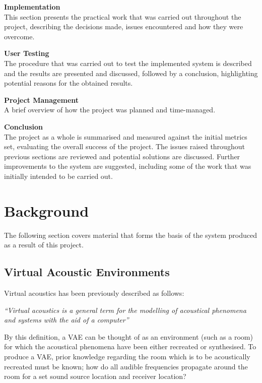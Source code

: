 \documentclass[../../main.tex]{subfiles}
\begin{document}
	\textbf{Implementation}\\
		This section presents the practical work that was carried out throughout the project, describing the decisions made, issues encountered and how they were overcome.

	\textbf{User Testing}\\	
		The procedure that was carried out to test the implemented system is described and the results are presented and discussed, followed by a conclusion, highlighting potential reasons for the obtained results.

	\textbf{Project Management}\\
		A brief overview of how the project was planned and time-managed.

	\textbf{Conclusion}\\
		The project as a whole is summarised and measured against the initial metrics set, evaluating the overall success of the project. The issues raised throughout previous sections are reviewed and potential solutions are discussed. Further improvements to the system are suggested, including some of the work that was initially intended to be carried out.

\pagebreak
{}
\section{Background}
	
	The following section covers material that forms the basis of the system produced as a result of this project.

	\subsection{Virtual Acoustic Environments}

		 Virtual acoustics has been previously described \cite{Huopaniemi2000} as follows: 

		 \vspace{5mm}
		 \begin{center}
		 \begin{minipage}{0.5\textwidth}
		 \textit{``Virtual acoustics is a general term for the modelling of acoustical phenomena and systems with the aid of a computer''}
		 \end{minipage}
		 \end{center}
		 \vspace{5mm}

		By this definition, a \ac{VAE} can be thought of as an environment (such as a room) for which the acoustical phenomena have been either recreated or synthesised. To produce a \ac{VAE}, prior knowledge regarding the room which is to be acoustically recreated must be known; how do all audible frequencies propagate around the room for a set sound source location and receiver location?
\end{document}

